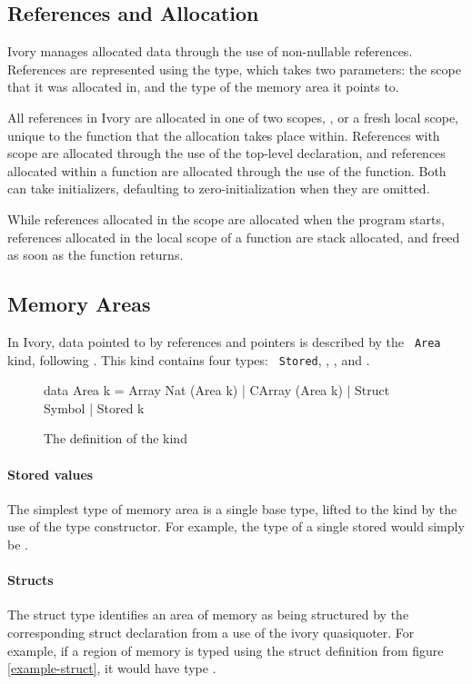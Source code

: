 \subsection{References and Allocation}
\label{sec:ref}
Ivory manages allocated data through the use of non-nullable references.
References are represented using the  type, which takes two parameters:
the scope that it was allocated in, and the type of the memory area it points
to.

All references in Ivory are allocated in one of two scopes, , or a
fresh local scope, unique to the function that the allocation takes place
within.  References with  scope are allocated through the use of the
 top-level declaration, and references allocated within a function are
allocated through the use of the  function.  Both can take
initializers, defaulting to zero-initialization when they are omitted.

While references allocated in the  scope are allocated when the
program starts, references allocated in the local scope of a function are stack
allocated, and freed as soon as the function returns.

\subsection{Memory Areas}
In Ivory, data pointed to by references and pointers is described by the {\tt
Area} kind, following \cite{memareas}.  This kind contains four types: {\tt
Stored}, , , and .

\begin{figure}[h]
\begin{code}
data Area k = Array Nat (Area k)
            | CArray (Area k)
            | Struct Symbol
            | Stored k
\end{code}
\caption{The definition of the  kind}
\end{figure}

\paragraph{Stored values}
The simplest type of memory area is a single base type, lifted to the 
kind by the use of the  type constructor.  For example, the type of
a single stored  would simply be .

\paragraph{Structs}
The struct type identifies an area of memory as being structured by the
corresponding struct declaration from a use of the ivory quasiquoter.  For
example, if a region of memory is typed using the struct definition from figure
\ref{example-struct}, it would have type .

